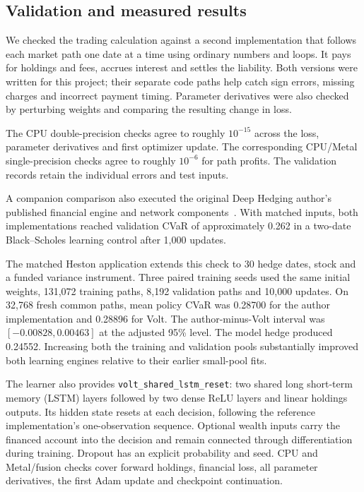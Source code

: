 \documentclass[8pt]{strategynet-journal}
\begin{document}
\begin{SNcolumns}
\section{Validation and measured results}
We checked the trading calculation against a second implementation that
follows each market path one date at a time using ordinary numbers and loops.
It pays for holdings and fees, accrues interest and settles the liability.
Both versions were written for this project; their separate code paths help
catch sign errors, missing charges and incorrect payment timing.
Parameter derivatives were also checked by perturbing weights and comparing
the resulting change in loss.

The CPU double-precision checks agree to roughly $10^{-15}$ across the loss,
parameter derivatives and first optimizer update. The corresponding
CPU/Metal single-precision checks agree to roughly $10^{-6}$ for path profits.
The validation records retain the individual errors and test inputs.

A companion comparison also executed the original Deep Hedging author's
published financial engine and network components~\cite{authorcode}.
With matched inputs, both implementations reached validation CVaR of
approximately 0.262 in a two-date Black--Scholes learning control after
1,000 updates.

The matched Heston application extends this check to 30 hedge dates, stock
and a funded variance instrument. Three paired training seeds used the same
initial weights, 131,072 training paths, 8,192 validation paths and 10,000
updates. On 32,768 fresh common paths, mean policy CVaR was 0.28700 for the
author implementation and 0.28896 for Volt. The author-minus-Volt interval
was $[-0.00828,0.00463]$ at the adjusted 95\% level. The model hedge produced
0.24552. Increasing both the training and validation pools substantially
improved both learning engines relative to their earlier small-pool fits.

The learner also provides \texttt{volt\_shared\_lstm\_reset}: two shared long short-term memory (LSTM)
layers followed by two dense ReLU layers and linear holdings outputs. Its
hidden state resets at each decision, following the reference implementation's
one-observation sequence. Optional wealth inputs carry the financed account
into the decision and remain connected through differentiation during
training. Dropout has an explicit probability and seed. CPU and Metal/fusion
checks cover forward holdings, financial loss, all parameter derivatives,
the first Adam update and checkpoint continuation.


\end{SNcolumns}
\end{document}
